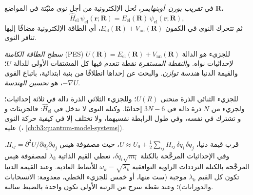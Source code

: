 \begin{definition}\label{def:b3:computational-chemistry:born-oppenheimer}
في \emph{تقريب بورن--أوبنهايمر}،
تُحل  الإلكترونية من أجل نوى
مثبّتة في المواضع $\mathbf R$،
\[
\hat H_{\mathrm{el}}\,\psi_{\mathrm{el}}(\mathbf r;\mathbf R) =
E_{\mathrm{el}}(\mathbf R)\,\psi_{\mathrm{el}}(\mathbf r;\mathbf R),
\]
ثم تتحرك النوى في الكمون $E_{\mathrm{el}}(\mathbf R) +
V_{\mathrm{nn}}(\mathbf R)$، أي الطاقة الإلكترونية مضافًا إليها تنافر
النوى.
\end{definition}

\begin{definition}\label{def:b3:computational-chemistry:pes}
\emph{سطح الطاقة الكامنة} (PES) للجزيء
هو الدالة $U(\mathbf R) = E_{\mathrm{el}}(\mathbf R) +
V_{\mathrm{nn}}(\mathbf R)$ لإحداثيات نواه. و\emph{النقطة
المستقرة} نقطة تنعدم فيها كل المشتقات الأولى للدالة $U$؛
والقيمة الدنيا \emph{هندسة توازن}.
والبحث عن إحداها انطلاقًا من بنية ابتدائية، باتباع
القوى $-\nabla U$، هو \emph{تحسين الهندسة}.
\end{definition}

 للجزيء الثنائي الذرة منحنى $U(R)$؛ وللجزيء الثلاثي الذرة
دالة في ثلاثة إحداثيات؛ ولجزيء من $N$ ذرة دالة في $3N - 6$ إحداثيًا. وكتلة
النوى لا تدخل في $\hat H_{\mathrm{el}}$: فالجزيئات  و و تشترك في
 نفسه، وفي طول الرابطة  نفسيهما، ولا تختلف إلا في كيفية
حركة النوى عليه (، \cref{ch:b3:quantum-model-systems}).

\begin{proposition}\label{prop:b3:computational-chemistry:hessian}
قرب قيمة دنيا، $U \approx U_0 + \frac12\sum_{ij}H_{ij}\,\delta q_i\,\delta q_j$، حيث
مصفوفة هيس $H_{ij} = \partial^2U/\partial q_i\partial q_j$. وفي الإحداثيات
المرجَّحة بالكتلة $\delta q_i\sqrt{m_i}$، تعطي القيم الذاتية $\lambda_k$ لمصفوفة
هيس المرجَّحة بالكتلة الترددات الزاوية التوافقية $\omega_k =
\sqrt{\lambda_k}$ للأنماط العادية. وعند القيمة الدنيا تكون كل القيم $\lambda_k$
موجبة (ست منها، أو خمس للجزيء الخطي، معدومة: الانسحابات
والدورانات)؛ وعند نقطة سرج من الرتبة الأولى تكون واحدة بالضبط سالبة.
\end{proposition}

